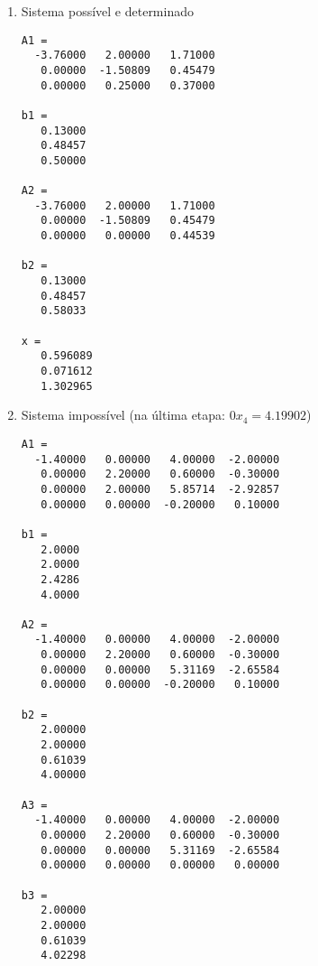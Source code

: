 \documentclass[a4paper]{article}
\begin{document}
\begin{enumerate}
\begin{enumerate}
  \item Sistema possível e determinado
\begin{verbatim}
A1 =
  -3.76000   2.00000   1.71000
   0.00000  -1.50809   0.45479
   0.00000   0.25000   0.37000

b1 =
   0.13000
   0.48457
   0.50000

A2 =
  -3.76000   2.00000   1.71000
   0.00000  -1.50809   0.45479
   0.00000   0.00000   0.44539

b2 =
   0.13000
   0.48457
   0.58033

x =
   0.596089
   0.071612
   1.302965
\end{verbatim}
    
  \item Sistema impossível (na última etapa: $0x_4=4.19902$)
\begin{verbatim}
A1 =
  -1.40000   0.00000   4.00000  -2.00000
   0.00000   2.20000   0.60000  -0.30000
   0.00000   2.00000   5.85714  -2.92857
   0.00000   0.00000  -0.20000   0.10000

b1 =
   2.0000
   2.0000
   2.4286
   4.0000

A2 =
  -1.40000   0.00000   4.00000  -2.00000
   0.00000   2.20000   0.60000  -0.30000
   0.00000   0.00000   5.31169  -2.65584
   0.00000   0.00000  -0.20000   0.10000

b2 =
   2.00000
   2.00000
   0.61039
   4.00000

A3 =
  -1.40000   0.00000   4.00000  -2.00000
   0.00000   2.20000   0.60000  -0.30000
   0.00000   0.00000   5.31169  -2.65584
   0.00000   0.00000   0.00000   0.00000

b3 =
   2.00000
   2.00000
   0.61039
   4.02298
\end{verbatim}



\end{enumerate}
\end{enumerate}
\end{document}
